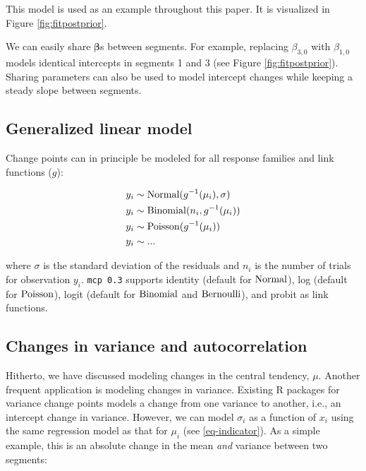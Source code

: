 \documentclass[
  american,
]{article}
\begin{document}
This model is used as an example throughout this paper. It is visualized in Figure \ref{fig:fitpostprior}.

We can easily share \(\mathbf{\beta}\)s between segments. For example, replacing \(\beta_{3,0}\) with \(\beta_{1,0}\) models identical intercepts in segments 1 and 3 (see Figure \ref{fig:fitpostprior}). Sharing parameters can also be used to model intercept changes while keeping a steady slope between segments.

\hypertarget{generalized-linear-model}{%
\subsection{Generalized linear model}\label{generalized-linear-model}}

Change points can in principle be modeled for all response families and link functions (\(g\)):

\begin{equation}
\label{eq-glm}
\begin{aligned}
y_i & \sim {\rm Normal}(g^{-1}(\mu_i), \sigma) \\
y_i & \sim {\rm Binomial}(n_i, g^{-1}(\mu_i)) \\
y_i & \sim {\rm Poisson}(g^{-1}(\mu_i)) \\
y_i & \sim ...
\end{aligned}
\end{equation}

where \(\sigma\) is the standard deviation of the residuals and \(n_i\) is the number of trials for observation \(y_i\). \texttt{mcp\ 0.3} supports identity (default for \({\rm Normal}\)), log (default for \({\rm Poisson}\)), logit (default for \(\rm{Binomial}\) and \(\rm{Bernoulli}\)), and probit as link functions.

\hypertarget{sigmaar-api}{%
\subsection{Changes in variance and autocorrelation}\label{sigmaar-api}}

Hitherto, we have discussed modeling changes in the central tendency, \(\mu\). Another frequent application is modeling changes in variance. Existing R packages for variance change points models a change from one variance to another, i.e., an intercept change in variance. However, we can model \(\sigma_i\) as a function of \(x_i\) using the same regression model as that for \(\mu_i\) (see \ref{eq-indicator}). As a simple example, this is an absolute change in the mean \emph{and} variance between two segments:
\end{document}
